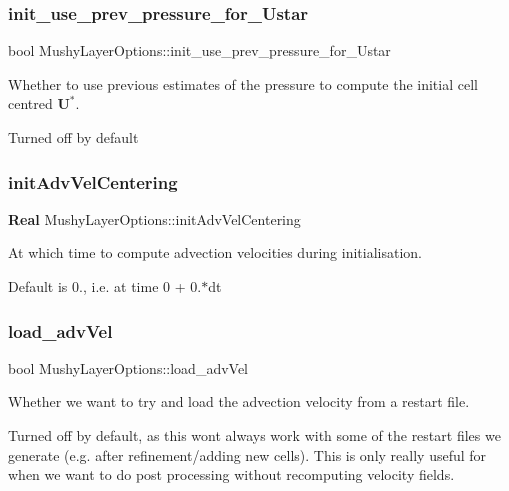 \subsubsection{\texorpdfstring{init\+\_\+use\+\_\+prev\+\_\+pressure\+\_\+for\+\_\+\+Ustar}{init\_use\_prev\_pressure\_for\_Ustar}}
{\footnotesize\ttfamily bool Mushy\+Layer\+Options\+::init\+\_\+use\+\_\+prev\+\_\+pressure\+\_\+for\+\_\+\+Ustar}



Whether to use previous estimates of the pressure to compute the initial cell centred $ \mathbf{U}^* $. 

Turned off by default \mbox{\label{struct_mushy_layer_options_abb4bbe1b7dc2088154775ac0915cd8e9}} 
\subsubsection{\texorpdfstring{init\+Adv\+Vel\+Centering}{initAdvVelCentering}}
{\footnotesize\ttfamily \textbf{ Real} Mushy\+Layer\+Options\+::init\+Adv\+Vel\+Centering}



At which time to compute advection velocities during initialisation. 

Default is 0., i.\+e. at time 0 + 0.$\ast$dt \mbox{\label{struct_mushy_layer_options_a6cf246b25ca25948fa22e673b62ca017}} 
\subsubsection{\texorpdfstring{load\+\_\+adv\+Vel}{load\_advVel}}
{\footnotesize\ttfamily bool Mushy\+Layer\+Options\+::load\+\_\+adv\+Vel}



Whether we want to try and load the advection velocity from a restart file. 

Turned off by default, as this won\textquotesingle{}t always work with some of the restart files we generate (e.\+g. after refinement/adding new cells). This is only really useful for when we want to do post processing without recomputing velocity fields. \mbox{\label{struct_mushy_layer_options_a1599e6fe13b0dc4c385cd1c835507bc5}} 
